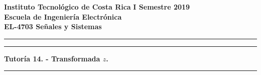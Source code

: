 
\onehalfspace
\noindent
\large\textbf{Instituto Tecnológico de Costa Rica} \hfill \textbf{I Semestre 2019} \\
\large\textbf{Escuela de Ingeniería Electrónica} \\
\large\textbf{EL-4703 Señales y Sistemas}

\noindent\rule[1mm]{\textwidth}{0.4pt}

\vspace{3mm}

\par\noindent\rule[-3mm]{\textwidth}{0.4pt}
\begin{center}
\Large\textbf{Tutoría 14. - Transformada $z$.}
\end{center}
\par\noindent\rule[6mm]{\textwidth}{0.4pt}

\vspace{2mm}

\setlength\parskip{3mm}
